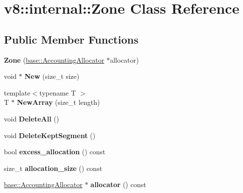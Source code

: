 \hypertarget{classv8_1_1internal_1_1_zone}{}\section{v8\+:\+:internal\+:\+:Zone Class Reference}
\label{classv8_1_1internal_1_1_zone}
\subsection*{Public Member Functions}
\begin{DoxyCompactItemize}
\item 
{\bfseries Zone} (\hyperlink{classv8_1_1base_1_1_accounting_allocator}{base\+::\+Accounting\+Allocator} $\ast$allocator)\hypertarget{classv8_1_1internal_1_1_zone_aee83ceb8dc15ebb761907452363a2c2f}{}\label{classv8_1_1internal_1_1_zone_aee83ceb8dc15ebb761907452363a2c2f}

\item 
void $\ast$ {\bfseries New} (size\+\_\+t size)\hypertarget{classv8_1_1internal_1_1_zone_ae1060ac572a5354da5cb7f12170b7c44}{}\label{classv8_1_1internal_1_1_zone_ae1060ac572a5354da5cb7f12170b7c44}

\item 
{\footnotesize template$<$typename T $>$ }\\T $\ast$ {\bfseries New\+Array} (size\+\_\+t length)\hypertarget{classv8_1_1internal_1_1_zone_ae8dd57543ca8ad136b47a99faad622dd}{}\label{classv8_1_1internal_1_1_zone_ae8dd57543ca8ad136b47a99faad622dd}

\item 
void {\bfseries Delete\+All} ()\hypertarget{classv8_1_1internal_1_1_zone_ae9dfff91c451f6e52ef4c2aa7c6946b8}{}\label{classv8_1_1internal_1_1_zone_ae9dfff91c451f6e52ef4c2aa7c6946b8}

\item 
void {\bfseries Delete\+Kept\+Segment} ()\hypertarget{classv8_1_1internal_1_1_zone_a5bec6bb7692c77f753081b29b00c78a4}{}\label{classv8_1_1internal_1_1_zone_a5bec6bb7692c77f753081b29b00c78a4}

\item 
bool {\bfseries excess\+\_\+allocation} () const \hypertarget{classv8_1_1internal_1_1_zone_a5375a18a29636a7934827b45815b08ac}{}\label{classv8_1_1internal_1_1_zone_a5375a18a29636a7934827b45815b08ac}

\item 
size\+\_\+t {\bfseries allocation\+\_\+size} () const \hypertarget{classv8_1_1internal_1_1_zone_ae30f6bfd31ce65a0696e00ebf613c406}{}\label{classv8_1_1internal_1_1_zone_ae30f6bfd31ce65a0696e00ebf613c406}

\item 
\hyperlink{classv8_1_1base_1_1_accounting_allocator}{base\+::\+Accounting\+Allocator} $\ast$ {\bfseries allocator} () const \hypertarget{classv8_1_1internal_1_1_zone_af1003e9b6315f1d2da2a292a8ee69d47}{}\label{classv8_1_1internal_1_1_zone_af1003e9b6315f1d2da2a292a8ee69d47}

\end{DoxyCompactItemize}
